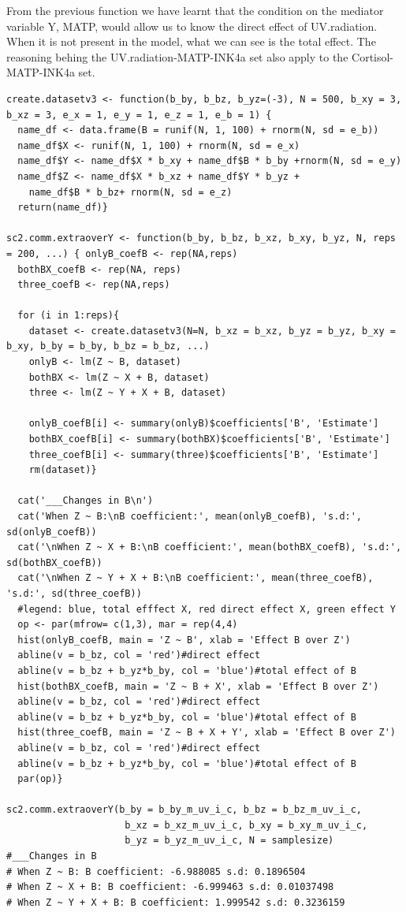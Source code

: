 \documentclass{article}
\begin{document}
From the previous function we have learnt that the condition on the mediator variable Y, MATP, would allow us to know the direct effect of UV.radiation. When it is not present in the model, what we can see is the total effect. The reasoning behing the UV.radiation-MATP-INK4a set also apply to the Cortisol-MATP-INK4a set.

\begin{lstlisting}
create.datasetv3 <- function(b_by, b_bz, b_yz=(-3), N = 500, b_xy = 3, b_xz = 3, e_x = 1, e_y = 1, e_z = 1, e_b = 1) {
  name_df <- data.frame(B = runif(N, 1, 100) + rnorm(N, sd = e_b))
  name_df$X <- runif(N, 1, 100) + rnorm(N, sd = e_x)
  name_df$Y <- name_df$X * b_xy + name_df$B * b_by +rnorm(N, sd = e_y)
  name_df$Z <- name_df$X * b_xz + name_df$Y * b_yz + 
    name_df$B * b_bz+ rnorm(N, sd = e_z)
  return(name_df)}

sc2.comm.extraoverY <- function(b_by, b_bz, b_xz, b_xy, b_yz, N, reps = 200, ...) { onlyB_coefB <- rep(NA,reps)
  bothBX_coefB <- rep(NA, reps)
  three_coefB <- rep(NA,reps)
  
  for (i in 1:reps){
    dataset <- create.datasetv3(N=N, b_xz = b_xz, b_yz = b_yz, b_xy = b_xy, b_by = b_by, b_bz = b_bz, ...)
    onlyB <- lm(Z ~ B, dataset)
    bothBX <- lm(Z ~ X + B, dataset)
    three <- lm(Z ~ Y + X + B, dataset)
    
    onlyB_coefB[i] <- summary(onlyB)$coefficients['B', 'Estimate']
    bothBX_coefB[i] <- summary(bothBX)$coefficients['B', 'Estimate']
    three_coefB[i] <- summary(three)$coefficients['B', 'Estimate']
    rm(dataset)}

  cat('___Changes in B\n')
  cat('When Z ~ B:\nB coefficient:', mean(onlyB_coefB), 's.d:', sd(onlyB_coefB))
  cat('\nWhen Z ~ X + B:\nB coefficient:', mean(bothBX_coefB), 's.d:', sd(bothBX_coefB))
  cat('\nWhen Z ~ Y + X + B:\nB coefficient:', mean(three_coefB), 's.d:', sd(three_coefB))
  #legend: blue, total efffect X, red direct effect X, green effect Y
  op <- par(mfrow= c(1,3), mar = rep(4,4)
  hist(onlyB_coefB, main = 'Z ~ B', xlab = 'Effect B over Z')
  abline(v = b_bz, col = 'red')#direct effect
  abline(v = b_bz + b_yz*b_by, col = 'blue')#total effect of B
  hist(bothBX_coefB, main = 'Z ~ B + X', xlab = 'Effect B over Z')
  abline(v = b_bz, col = 'red')#direct effect
  abline(v = b_bz + b_yz*b_by, col = 'blue')#total effect of B
  hist(three_coefB, main = 'Z ~ B + X + Y', xlab = 'Effect B over Z')
  abline(v = b_bz, col = 'red')#direct effect
  abline(v = b_bz + b_yz*b_by, col = 'blue')#total effect of B
  par(op)}

sc2.comm.extraoverY(b_by = b_by_m_uv_i_c, b_bz = b_bz_m_uv_i_c,
                     b_xz = b_xz_m_uv_i_c, b_xy = b_xy_m_uv_i_c,
                     b_yz = b_yz_m_uv_i_c, N = samplesize)
#___Changes in B
# When Z ~ B: B coefficient: -6.988085 s.d: 0.1896504
# When Z ~ X + B: B coefficient: -6.999463 s.d: 0.01037498
# When Z ~ Y + X + B: B coefficient: 1.999542 s.d: 0.3236159
\end{lstlisting}
\end{document}
